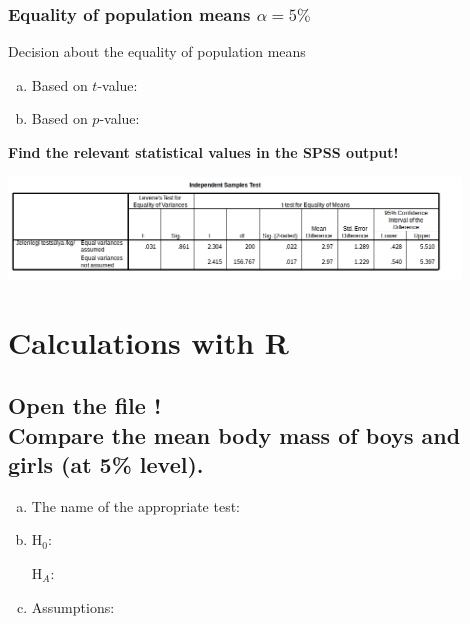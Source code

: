 \subsubsection*{Equality of population means $\alpha=5\%$}


		Decision about the equality of population means 

			\begin{enumerate}[a)]
			\item 	Based on $t$-value: \hrulefill
			\item 	Based on $p$-value:  \hrulefill
		
			\end{enumerate}
		
		\textbf{Find the relevant statistical values in the SPSS output!}
		
			\begin{center}
			\includegraphics[width=0.9\textwidth]{SPSS/Ketmintas2b}
			\end{center}


\clearpage

\section{Calculations with R}
\subsection{Open the file \quest!\\ Compare the mean body mass of boys and girls (at 5\% level).}
	
	\begin{enumerate}[a)]
	\item The name of the appropriate test:\hrulefill
	\item H$_0$:	\hrulefill
	
		H$_A$:	\hrulefill
		
	\item Assumptions: 	\hrulefill
	\end{enumerate}
	
